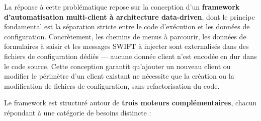 \documentclass[12pt, a4paper]{report}
\begin{document}
La réponse à cette problématique repose sur la conception d'un \textbf{framework d'automatisation multi-client à architecture data-driven}, dont le principe fondamental est la séparation stricte entre le code d'exécution et les données de configuration. Concrètement, les chemins de menus à parcourir, les données de formulaires à saisir et les messages SWIFT à injecter sont externalisés dans des fichiers de configuration dédiés — aucune donnée client n'est encodée en dur dans le code source. Cette conception garantit qu'ajouter un nouveau client ou modifier le périmètre d'un client existant ne nécessite que la création ou la modification de fichiers de configuration, sans refactorisation du code.

Le framework est structuré autour de \textbf{trois moteurs complémentaires}, chacun répondant à une catégorie de besoins distincte :
\end{document}
